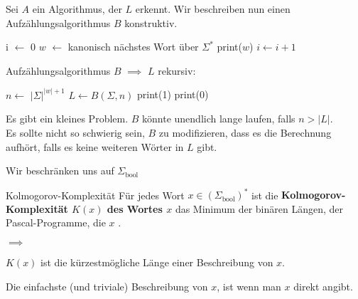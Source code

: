     Sei $A$ ein Algorithmus, der $L$ erkennt. Wir beschreiben nun einen Aufzählungsalgorithmus $B$ konstruktiv. 

    \begin{algorithm}[H]
        \caption{$B(\Sigma, n)$}
        \begin{algorithmic}
            \State i $\leftarrow$ 0
                \State $w$ $\leftarrow$ kanonisch nächstes Wort über $\Sigma^*$
                \State print($w$)
                \State $i \leftarrow i + 1$
                \EndIf 
            \EndWhile
        \end{algorithmic}
    \end{algorithm}

    Aufzählungsalgorithmus $B$ $\implies$ $L$ rekursiv:

    \begin{algorithm}[H]
        \caption{$A(\Sigma, w)$}
        \begin{algorithmic}
            \State$n \leftarrow$ $|\Sigma|^{|w| + 1}$
            \State $L \leftarrow B(\Sigma, n)$
            \State print(1)
            \Else
            \State print(0)
            \EndIf
        \end{algorithmic}
    \end{algorithm}
    Es gibt ein kleines Problem. $B$ könnte unendlich lange laufen, falls $n > |L|$.\\ 
    Es sollte nicht so schwierig sein, $B$ zu modifizieren, dass es die Berechnung aufhört, falls es keine weiteren Wörter in $L$ gibt.




    Wir beschränken uns auf $\Sigma_{\text{bool}}$
    \begin{mainbox}{Kolmogorov-Komplexität}
        Für jedes Wort $x \in (\Sigma_{\text{bool}})^*$ ist die \textbf{Kolmogorov-Komplexität $K(x)$ des Wortes $x$} das Minimum der binären Längen, der Pascal-Programme, die $x$ .
    \end{mainbox}
    $\implies$ 

    $K(x)$ ist die kürzestmögliche Länge einer Beschreibung von $x$.

    Die einfachste (und triviale) Beschreibung von $x$, ist wenn man $x$ direkt angibt.

